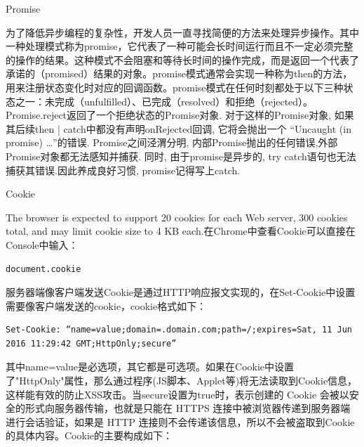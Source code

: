 \documentclass[12pt]{book}
\makeatletter
\numberwithin{dummy}{section}
\theoremstyle{ocrenumbox}
\theoremstyle{blacknumex}
\theoremstyle{blacknumbox}
\theoremstyle{ocrenum}
\renewcommand{\section}{\@startsection{section}{1}{\z@}
	{-4ex \@plus -1ex \@minus -.4ex}
	{1ex \@plus.2ex }
	{\normalfont\large\sffamily\bfseries}}
\renewcommand{\subsection}{\@startsection {subsection}{2}{\z@}
	{-3ex \@plus -0.1ex \@minus -.4ex}
	{0.5ex \@plus.2ex }
	{\normalfont\sffamily\bfseries}}
\makeatother
\begin{document}
\subsection{Promise}

为了降低异步编程的复杂性，开发人员一直寻找简便的方法来处理异步操作。其中一种处理模式称为promise，它代表了一种可能会长时间运行而且不一定必须完整的操作的结果。这种模式不会阻塞和等待长时间的操作完成，而是返回一个代表了承诺的（promised）结果的对象。promise模式通常会实现一种称为then的方法，用来注册状态变化时对应的回调函数。promise模式在任何时刻都处于以下三种状态之一：未完成（unfulfilled）、已完成（resolved）和拒绝（rejected）。Promise.reject返回了一个拒绝状态的Promise对象. 对于这样的Promise对象, 如果其后续then | catch中都没有声明onRejected回调, 它将会抛出一个 “Uncaught (in promise) …”的错误. Promise之间泾渭分明, 内部Promise抛出的任何错误,外部Promise对象都无法感知并捕获. 同时, 由于promise是异步的, try catch语句也无法捕获其错误.因此养成良好习惯, promise记得写上catch.

\section{Cookie}

The browser is expected to support 20 cookies for each Web server, 300 cookies total, and may limit cookie size to 4 KB each.在Chrome中查看Cookie可以直接在Console中输入：

\begin{lstlisting}[language=Bash]
document.cookie
\end{lstlisting}

服务器端像客户端发送Cookie是通过HTTP响应报文实现的，在Set-Cookie中设置需要像客户端发送的cookie，cookie格式如下：

\begin{lstlisting}
Set-Cookie: “name=value;domain=.domain.com;path=/;expires=Sat, 11 Jun 2016 11:29:42 GMT;HttpOnly;secure”
\end{lstlisting}

其中name=value是必选项，其它都是可选项。如果在Cookie中设置了"HttpOnly"属性，那么通过程序(JS脚本、Applet等)将无法读取到Cookie信息，这样能有效的防止XSS攻击。当secure设置为true时，表示创建的 Cookie 会被以安全的形式向服务器传输，也就是只能在 HTTPS 连接中被浏览器传递到服务器端进行会话验证，如果是 HTTP 连接则不会传递该信息，所以不会被盗取到Cookie 的具体内容。Cookie的主要构成如下：
\end{document}

